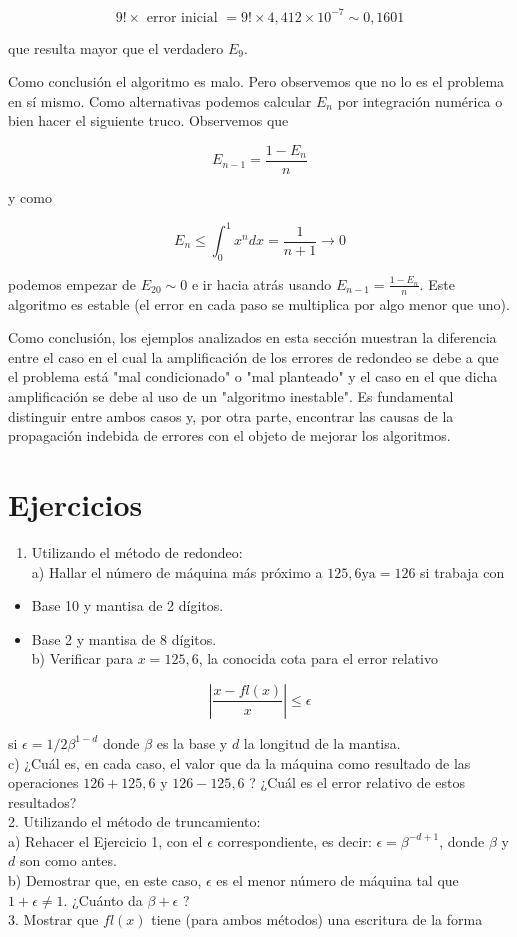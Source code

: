 \documentclass[10pt]{book}
\begin{document}
$$
9!\times \text { error inicial }=9!\times 4,412 \times 10^{-7} \sim 0,1601
$$

que resulta mayor que el verdadero $E_{9}$.

Como conclusión el algoritmo es malo. Pero observemos que no lo es el problema en sí mismo. Como alternativas podemos calcular $E_{n}$ por integración numérica o bien hacer el siguiente truco. Observemos que

$$
E_{n-1}=\frac{1-E_{n}}{n}
$$

y como

$$
E_{n} \leq \int_{0}^{1} x^{n} d x=\frac{1}{n+1} \rightarrow 0
$$

podemos empezar de $E_{20} \sim 0$ e ir hacia atrás usando $E_{n-1}=\frac{1-E_{n}}{n}$. Este algoritmo es estable (el error en cada paso se multiplica por algo menor que uno).

Como conclusión, los ejemplos analizados en esta sección muestran la diferencia entre el caso en el cual la amplificación de los errores de redondeo se debe a que el problema está "mal condicionado" o "mal planteado" y el caso en el que dicha amplificación se debe al uso de un "algoritmo inestable". Es fundamental distinguir entre ambos casos y, por otra parte, encontrar las causas de la propagación indebida de errores con el objeto de mejorar los algoritmos.

\section{Ejercicios}
\begin{enumerate}
  \item Utilizando el método de redondeo:\\
a) Hallar el número de máquina más próximo a $125,6 \mathrm{y} \mathrm{a}=126$ si trabaja con
\end{enumerate}

\begin{itemize}
  \item Base 10 y mantisa de 2 dígitos.
  \item Base 2 y mantisa de 8 dígitos.\\
b) Verificar para $x=125,6$, la conocida cota para el error relativo
\end{itemize}

$$
\left|\frac{x-f l(x)}{x}\right| \leq \epsilon
$$

si $\epsilon=1 / 2 \beta^{1-d}$ donde $\beta$ es la base y $d$ la longitud de la mantisa.\\
c) ¿Cuál es, en cada caso, el valor que da la máquina como resultado de las operaciones $126+125,6$ y $126-125,6$ ? ¿Cuál es el error relativo de estos resultados?\\
2. Utilizando el método de truncamiento:\\
a) Rehacer el Ejercicio 1, con el $\epsilon$ correspondiente, es decir: $\epsilon=\beta^{-d+1}$, donde $\beta$ y $d$ son como antes.\\
b) Demostrar que, en este caso, $\epsilon$ es el menor número de máquina tal que $1+\epsilon \neq 1$. ¿Cuánto da $\beta+\epsilon$ ?\\
3. Mostrar que $f l(x)$ tiene (para ambos métodos) una escritura de la forma
\end{document}
